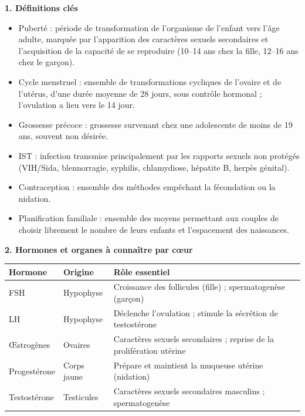 \documentclass[11pt]{article}
\newcommand{\cle}[1]{{\popxbold\color{popdark}#1}}
\begin{document}
\begin{bilan}
\textbf{1. Définitions clés}
\begin{itemize}
  \item \cle{Puberté} : période de transformation de l'organisme de l'enfant vers l'âge adulte, marquée par l'apparition des caractères sexuels secondaires et l'acquisition de la capacité de se reproduire (10--14 ans chez la fille, 12--16 ans chez le garçon).
  \item \cle{Cycle menstruel} : ensemble de transformations cycliques de l'ovaire et de l'utérus, d'une durée moyenne de 28 jours, sous contrôle hormonal ; l'\cle{ovulation} a lieu vers le 14\ieme{} jour.
  \item \cle{Grossesse précoce} : grossesse survenant chez une adolescente de moins de 19 ans, souvent non désirée.
  \item \cle{IST} : infection transmise principalement par les rapports sexuels non protégés (VIH/Sida, blennorragie, syphilis, chlamydiose, hépatite B, herpès génital).
  \item \cle{Contraception} : ensemble des méthodes empêchant la fécondation ou la nidation.
  \item \cle{Planification familiale} : ensemble des moyens permettant aux couples de choisir librement le nombre de leurs enfants et l'espacement des naissances.
\end{itemize}

\textbf{2. Hormones et organes à connaître par c{\oe}ur}
\begin{center}
\begin{tabularx}{\linewidth}{|l|X|X|}\hline
\rowcolor{popblueL} \textbf{Hormone} & \textbf{Origine} & \textbf{Rôle essentiel} \\ \hline
FSH & Hypophyse & Croissance des follicules (fille) ; spermatogenèse (garçon) \\ \hline
LH & Hypophyse & Déclenche l'ovulation ; stimule la sécrétion de testostérone \\ \hline
{\OE}strogènes & Ovaires & Caractères sexuels secondaires ; reprise de la prolifération utérine \\ \hline
Progestérone & Corps jaune & Prépare et maintient la muqueuse utérine (nidation) \\ \hline
Testostérone & Testicules & Caractères sexuels secondaires masculins ; spermatogenèse \\ \hline
\end{tabularx}
\end{center}


\end{bilan}
\end{document}
